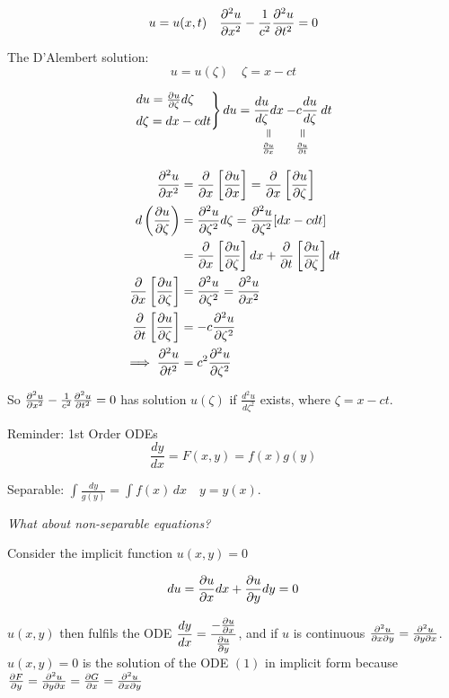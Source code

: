 \documentclass[twoside]{scrartcl}
\begin{document}

\[u = u(x,t) \quad \frac{\partial^2u}{\partial x^2} - \frac{1}{c^2}\frac{\partial^2u}{\partial t^2} = 0\]

The D'Alembert solution:
\[\boxed{u = u(\zeta) \quad \zeta = x -ct}\]

\[
\begin{rcases*}
du = \frac{\del u}{\del \zeta} d\zeta\\
d\zeta = dx - cdt	
\end{rcases*}
du = \equalto{\frac{du}{d\zeta}dx}{\frac{\del u}{\del x}} \equalto{- c\frac{du}{d\zeta}}{\frac{\del u}{\del t}}dt
\]

\[
\begin{aligned}
  \frac{\partial^2u}{\partial x^2} &= \frac{\partial}{\partial x}\left[\frac{\partial u}{\partial x}\right] = \frac{\partial}{\partial x}\left[\frac{\partial u}{\partial \zeta}\right]\\
  d\left(\frac{\partial u}{\partial \zeta}\right) &=  \frac{\partial^2u}{\partial \zeta^2}d\zeta = \frac{\partial^2u}{\partial \zeta^2}[dx - cdt]\\
  &= \frac{\partial}{\partial x}\left[\frac{\partial u}{\partial \zeta}\right]dx + \frac{\partial}{\partial t}\left[\frac{\partial u}{\partial \zeta}\right]dt\\
  \frac{\partial}{\partial x}\left[\frac{\partial u}{\partial \zeta}\right] &= \frac{\partial^2u}{\partial \zeta^2} = \frac{\partial^2u}{\partial x^2}\\
  \frac{\partial}{\partial t}\left[\frac{\partial u}{\partial \zeta}\right] &= -c\frac{\partial^2u}{\partial \zeta^2}\\
  \implies \frac{\partial^2u}{\partial t^2} &= c^2\frac{\partial^2u}{\partial \zeta^2}
\end{aligned}
\]

So $\frac{\partial^2u}{\partial x^2} -\frac{1}{c^2}\frac{\partial^2u}{\partial t^2} = 0$ has solution $u(\zeta)$ if $\frac{d^2u}{d\zeta^2}$ exists, where $\zeta = x-ct$. 

Reminder: 1st Order ODEs
\[\frac{dy}{dx} = F(x,y) = f(x)g(y)\]

Separable: $\displaystyle{\int \frac{dy}{g(y)} = \int f(x)\,dx\quad y = y(x)}$. 

\emph{What about non-separable equations?}

Consider the implicit function $u(x,y) = 0$

\[du = \frac{\partial u}{\partial x}dx + \frac{\partial u}{\partial y}dy = 0\]

$u(x,y)$ then fulfils the ODE $\dfrac{dy}{dx} = \dfrac{-\frac{\partial u}{\partial x}}{\frac{\partial u}{\partial y}}$, and if $u$ is continuous $\frac{\partial^2u}{\partial x\partial y}= \tfrac{\partial^2u}{\partial y\partial x}$. $u(x,y) = 0$ is the solution of the ODE $(1)$ in implicit form because $\frac{\partial F}{\partial y} = \frac{\partial^2u}{\partial y\partial x} = \frac{\partial G}{\partial x} = \frac{\partial^2u}{\partial x\partial y}$\\
\end{document}
